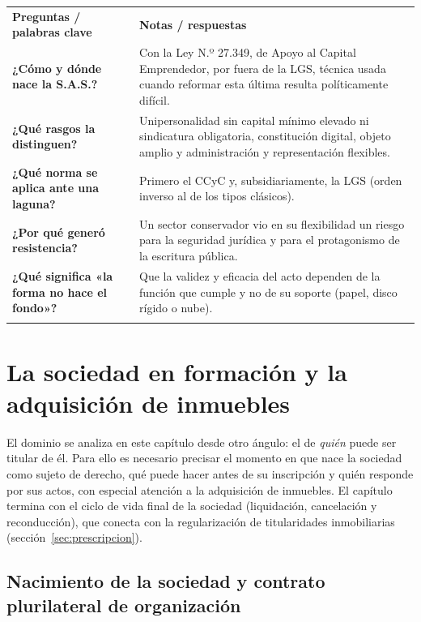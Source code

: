 \documentclass[12pt,oneside]{book}
\newcommand{\cq}[1]{\textbf{#1}}
\newcommand{\cornell}[3]{%
  \par\medskip\noindent\begingroup
  \renewcommand{\arraystretch}{1.25}%
  \begin{tabularx}{\textwidth}{|>{\raggedright\arraybackslash}p{0.27\textwidth}|>{\raggedright\arraybackslash}X|}
    \hline
    \multicolumn{2}{|>{\centering\arraybackslash}X|}{\cellcolor{azulacad!12}\textbf{Cuadro Cornell --- #1}}\\ \hline
    \cellcolor{gray!10}\textbf{Preguntas / palabras clave} & \cellcolor{gray!10}\textbf{Notas / respuestas} \\ \hline
    #2
    \multicolumn{2}{|>{\raggedright\arraybackslash}X|}{\cellcolor{azulacad!6}\textbf{Resumen.} #3}\\ \hline
  \end{tabularx}%
  \endgroup\par\medskip}
\begin{document}
\cornell{La sociedad por acciones simplificada}{
\cq{¿Cómo y dónde nace la S.A.S.?} & Con la Ley N.º 27.349, de Apoyo al Capital Emprendedor, por fuera de la LGS, técnica usada cuando reformar esta última resulta políticamente difícil. \\ \hline
\cq{¿Qué rasgos la distinguen?} & Unipersonalidad sin capital mínimo elevado ni sindicatura obligatoria, constitución digital, objeto amplio y administración y representación flexibles. \\ \hline
\cq{¿Qué norma se aplica ante una laguna?} & Primero el CCyC y, subsidiariamente, la LGS (orden inverso al de los tipos clásicos). \\ \hline
\cq{¿Por qué generó resistencia?} & Un sector conservador vio en su flexibilidad un riesgo para la seguridad jurídica y para el protagonismo de la escritura pública. \\ \hline
\cq{¿Qué significa «la forma no hace el fondo»?} & Que la validez y eficacia del acto dependen de la función que cumple y no de su soporte (papel, disco rígido o nube). \\ \hline
}{La S.A.S. es la respuesta más flexible y digital a la rigidez de la tipicidad clásica. Su aceptación plantea la cuestión de la forma: para este enfoque, lo decisivo es la función cumplida por el acto y no su soporte.}

\chapter{La sociedad en formación y la adquisición de inmuebles}
\label{cap:formacion}

El dominio se analiza en este capítulo desde otro ángulo: el de \emph{quién} puede ser titular de él. Para ello es necesario precisar el momento en que nace la sociedad como sujeto de derecho, qué puede hacer antes de su inscripción y quién responde por sus actos, con especial atención a la adquisición de inmuebles. El capítulo termina con el ciclo de vida final de la sociedad (liquidación, cancelación y reconducción), que conecta con la regularización de titularidades inmobiliarias (sección~\ref{sec:prescripcion}).

\section{Nacimiento de la sociedad y contrato plurilateral de organización}
\label{sec:nacimiento}
\end{document}
